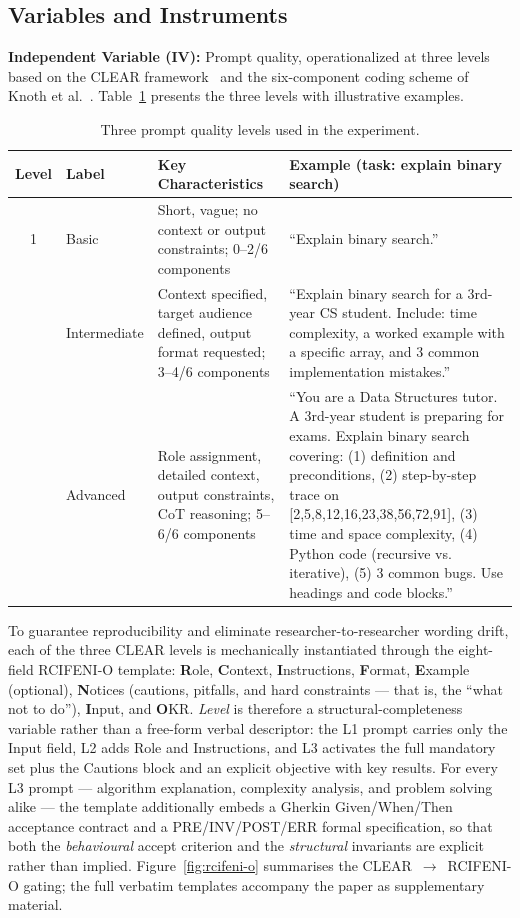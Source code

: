 \documentclass[runningheads]{llncs}
\begin{document}
\subsection{Variables and Instruments}

\textbf{Independent Variable (IV):} Prompt quality, operationalized at three levels based on the CLEAR framework~\cite{Lo2023} and the six-component coding scheme of Knoth et al.~\cite{Knoth2024}. Table~\ref{tab:prompt-levels} presents the three levels with illustrative examples.

\begin{table}[h]
\caption{Three prompt quality levels used in the experiment.}\label{tab:prompt-levels}
\centering
\begin{tabular}{@{}clp{3.5cm}p{5cm}@{}}
\toprule
\textbf{Level} & \textbf{Label} & \textbf{Key Characteristics} & \textbf{Example (task: explain binary search)} \\
\midrule
1 & Basic & Short, vague; no context or output constraints; 0--2/6 components & ``Explain binary search.'' \\
\addlinespace
2 & Intermediate & Context specified, target audience defined, output format requested; 3--4/6 components & ``Explain binary search for a 3rd-year CS student. Include: time complexity, a worked example with a specific array, and 3 common implementation mistakes.'' \\
\addlinespace
3 & Advanced & Role assignment, detailed context, output constraints, CoT reasoning; 5--6/6 components & ``You are a Data Structures tutor. A 3rd-year student is preparing for exams. Explain binary search covering: (1) definition and preconditions, (2) step-by-step trace on [2,5,8,12,16,23,38,56,72,91], (3) time and space complexity, (4) Python code (recursive vs. iterative), (5) 3 common bugs. Use headings and code blocks.'' \\
\bottomrule
\end{tabular}
\end{table}

To guarantee reproducibility and eliminate researcher-to-researcher wording drift, each of the three CLEAR levels is mechanically instantiated through the eight-field RCIFENI-O template: \textbf{R}ole, \textbf{C}ontext, \textbf{I}nstructions, \textbf{F}ormat, \textbf{E}xample (optional), \textbf{N}otices (cautions, pitfalls, and hard constraints --- that is, the ``what not to do''), \textbf{I}nput, and \textbf{O}KR. \emph{Level} is therefore a structural-completeness variable rather than a free-form verbal descriptor: the L1 prompt carries only the Input field, L2 adds Role and Instructions, and L3 activates the full mandatory set plus the Cautions block and an explicit objective with key results. For every L3 prompt --- algorithm explanation, complexity analysis, and problem solving alike --- the template additionally embeds a Gherkin Given/When/Then acceptance contract and a PRE/INV/POST/ERR formal specification, so that both the \emph{behavioural} accept criterion and the \emph{structural} invariants are explicit rather than implied. Figure~\ref{fig:rcifeni-o} summarises the CLEAR~$\to$~RCIFENI-O gating; the full verbatim templates accompany the paper as supplementary material.
\end{document}
